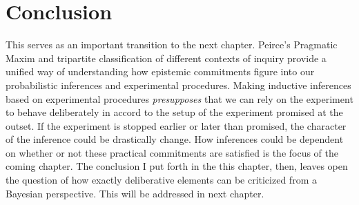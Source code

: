 \section{Conclusion}

This serves as an important transition to the next chapter. Peirce's Pragmatic Maxim and tripartite classification of different contexts of inquiry provide a unified way of understanding how epistemic commitments figure into our probabilistic inferences and experimental procedures. Making inductive inferences based on experimental procedures \emph{presupposes} that we can rely on the experiment to behave deliberately in accord to the setup of the experiment promised at the outset. If the experiment is stopped earlier or later than promised, the character of the inference could be drastically change. How inferences could be dependent on whether or not these practical commitments are satisfied is the focus of the coming chapter. The conclusion I put forth in the this chapter, then, leaves open the question of how exactly deliberative elements can be criticized from a Bayesian perspective. This will be addressed in next chapter.

